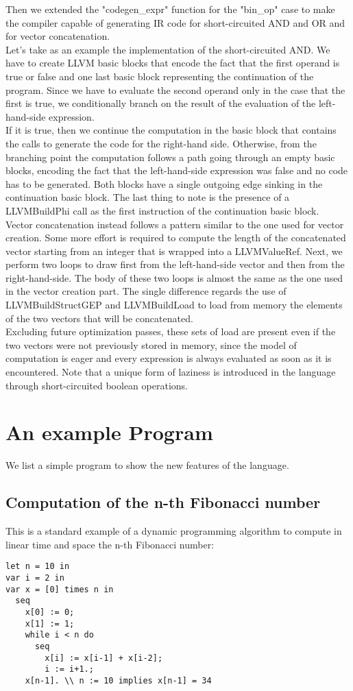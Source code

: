 \documentclass[11pt]{article}
\begin{document}
Then we extended the "codegen\_expr" function for the "bin\_op" case to make the compiler capable of generating IR code for short-circuited AND and OR and for vector concatenation.\\
Let's take as an example the implementation of the short-circuited AND. We have to create LLVM basic blocks that encode the fact that the first operand is true or false and one last basic block representing the continuation of the program.
Since we have to evaluate the second operand only in the case that the first is true, we conditionally branch on the result of the evaluation of the left-hand-side expression.\\
If it is true, then we continue the computation in the basic block that contains the calls to generate the code for the right-hand side.
Otherwise, from the branching point the computation follows a path going through an empty basic blocks, encoding the fact that the left-hand-side expression was false and no code has to be generated.
Both blocks have a single outgoing edge sinking in the continuation basic block.
The last thing to note is the presence of a LLVMBuildPhi call as the first instruction of the continuation basic block. \\
Vector concatenation instead follows a pattern similar to the one used for vector creation. Some more effort is required to compute the length of the concatenated vector starting from an integer that is wrapped into a LLVMValueRef.
Next, we perform two loops to draw first from the left-hand-side vector and then from the right-hand-side. The body of these two loops is almost the same as the one used in the vector creation part. The single difference regards the use of LLVMBuildStructGEP and LLVMBuildLoad to load from memory the elements of the two vectors that will be concatenated. \\
Excluding future optimization passes, these sets of load are present even if the two vectors were not previously stored in memory, since the model of computation is eager and every expression is always evaluated as soon as it is encountered.
Note that a unique form of laziness is introduced in the language through short-circuited boolean operations.    \\
\section{An example Program}
We list a simple program to show the new features of the language.

\subsection{Computation of the n-th Fibonacci number}
This is a standard example of a dynamic programming algorithm to compute in linear time and space the n-th Fibonacci number:
\begin{verbatim}
let n = 10 in
var i = 2 in
var x = [0] times n in
  seq 
    x[0] := 0;
    x[1] := 1;
    while i < n do
      seq
        x[i] := x[i-1] + x[i-2];
        i := i+1.;
    x[n-1]. \\ n := 10 implies x[n-1] = 34
\end{verbatim}
\end{document}
